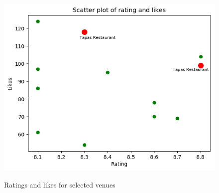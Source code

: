 \documentclass[11pt]{article}
\numberwithin{equation}{section}
\begin{document}
\begin{figure}[H]
	\centering
	\includegraphics[width=.6\textwidth]{pics/ratings_and_likes}
		\label{fig:1_1}
	\caption{Ratings and likes for selected venues}
	\label{fig:4}
\end{figure}
%
\end{document}
